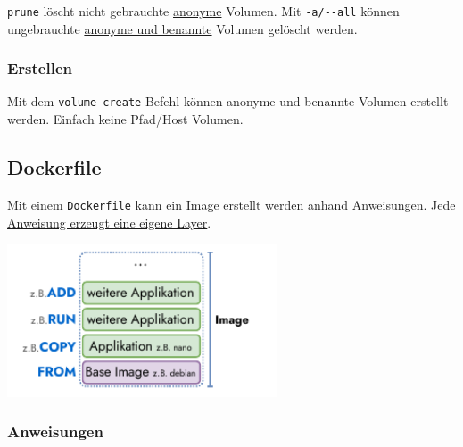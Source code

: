 \documentclass[
  10pt,
  a4paper,
  twocolumn]{article}
\newenvironment{Shaded}{}{}
\newcommand{\ExtensionTok}[1]{\textcolor[rgb]{0.84,0.23,0.29}{\textbf{#1}}}
\newcommand{\NormalTok}[1]{\textcolor[rgb]{0.14,0.16,0.18}{#1}}
\newcommand{\PreprocessorTok}[1]{\textcolor[rgb]{0.84,0.23,0.29}{#1}}
\newcommand{\SpecialStringTok}[1]{\textcolor[rgb]{0.01,0.18,0.38}{#1}}
\begin{document}
\texttt{prune} löscht nicht gebrauchte \ul{anonyme} Volumen. Mit
\texttt{-a/-\/-all} können ungebrauchte \ul{anonyme und benannte}
Volumen gelöscht werden.

\begin{Shaded}
\end{Shaded}

\subsubsection{\texorpdfstring{{\small \faTerminal\hspace{1mm}}
Erstellen}{ Erstellen}}\label{erstellen}

Mit dem \texttt{volume\ create} Befehl können anonyme und benannte
Volumen erstellt werden. Einfach keine Pfad/Host Volumen.

\begin{Shaded}
\end{Shaded}

\subsection{Dockerfile}\label{dockerfile}

Mit einem \faFile[regular] \texttt{Dockerfile} kann ein Image erstellt
werden anhand Anweisungen. \ul{Jede Anweisung erzeugt eine eigene
Layer}.

\begin{center}
\includegraphics[width=8cm,height=\textheight]{images/docker/dockerfile_image.pdf}
\end{center}

\subsubsection{Anweisungen}\label{anweisungen}
\end{document}
